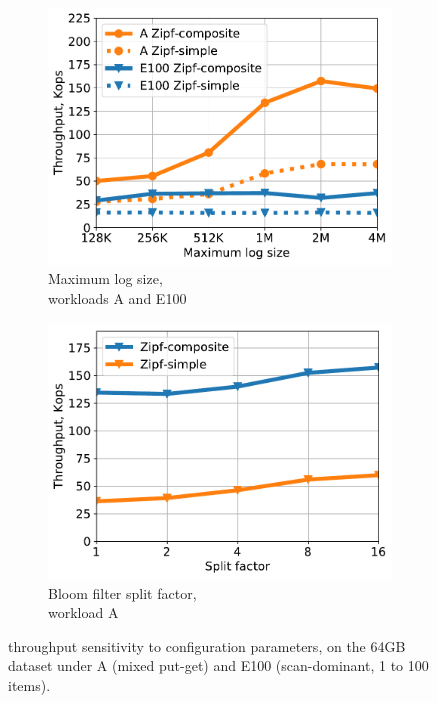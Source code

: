 \begin{figure}[htb]
\centering
\begin{subfigure}{0.49\linewidth}
\includegraphics[width=\textwidth]{figs/max_log_size_line.pdf}
\caption{Maximum log size,\\  workloads A and E100}
\label{fig:params:log}
\end{subfigure}
\begin{subfigure}{0.49\linewidth}
\includegraphics[width=\textwidth]{figs/Bloom_filter_line.pdf}
\caption{Bloom filter split factor,\\ workload A}
\label{fig:params:bf}
\end{subfigure}
\caption{{\sys\/ throughput sensitivity to configuration parameters, on the 64GB dataset under  A (mixed put-get) and 
E100 (scan-dominant, 1 to 100 items).}}
\label{fig:params}
\end{figure}

